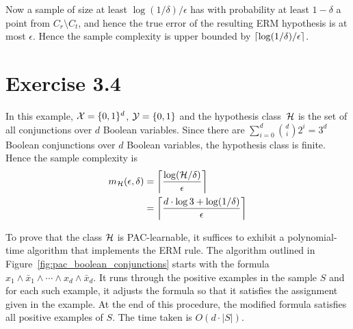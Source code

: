 Now a sample of size at least $\log(1 / \delta) / \epsilon$ has with
probability at least $1 - \delta$ a point from $C_r \setminus C_t$, and hence
the true error of the resulting ERM hypothesis is at most $\epsilon$. Hence the
sample complexity is upper bounded by $\left \lceil \log(1 / \delta) / \epsilon \right \rceil$.

\section*{Exercise 3.4}

In this example, $\mathcal{X} = \{0, 1\}^d$, $\mathcal{Y} = \{0, 1\}$ and the hypothesis
class~$\mathcal{H}$ is the set of all conjunctions over $d$ Boolean variables.
Since there are $\sum_{i = 0}^{d} {d \choose i} 2^i = 3^{d}$ Boolean
conjunctions over $d$ Boolean variables, the hypothesis class is finite. Hence
the sample complexity is 
\begin{align*}
	m_{\mathcal{H}}(\epsilon, \delta) & = \left \lceil \frac{\log (\mathcal{H} / \delta)}{\epsilon} \right \rceil \\
	& = \left \lceil \frac{d \cdot \log 3 + \log (1 / \delta)}{\epsilon} \right \rceil
\end{align*}

To prove that the class $\mathcal{H}$ is PAC-learnable, it suffices to exhibit a
polynomial-time algorithm that implements the ERM rule. The algorithm outlined
in Figure~\ref{fig:pac_boolean_conjunctions} starts with the formula $x_1 \land
\bar{x}_1 \land \cdots \land x_d \land \bar{x}_d$. It runs through the positive
examples in the sample $S$ and for each such example, it adjusts the formula so
that it satisfies the assignment given in the example. At the end of this
procedure, the modified formula satisfies all positive examples of $S$. The
time taken is $O(d \cdot |S|)$. 


